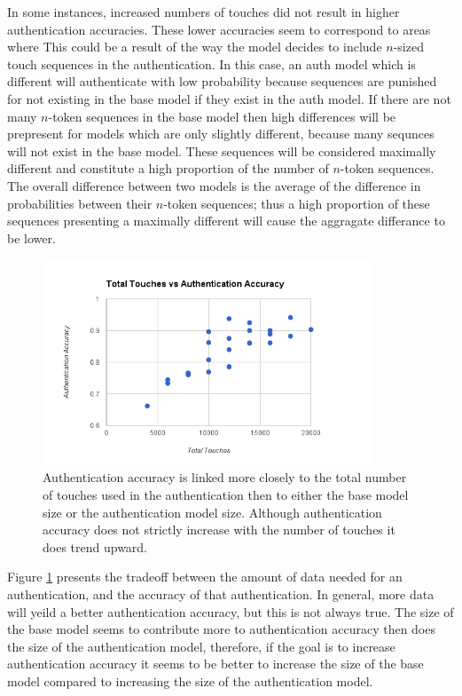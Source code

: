 \documentclass{acm_proc_article-sp}
\begin{document}
In some instances, increased numbers of touches did not result in higher authentication accuracies. 
These lower accuracies seem to correspond to areas where %
 This could be a result of the way the model decides to include $n$-sized touch sequences in the authentication. 
In this case, an auth model which is  different will authenticate with low probability because sequences are punished for not existing in the base model if they exist in the auth model.
If there are not many $n$-token sequences in the base model then high differences will be prepresent for models which are only slightly different, because many sequnces will not exist in the base model.
These sequences will be considered maximally different and constitute a high proportion of the number of $n$-token sequences.
The overall difference between two models is the average of the difference in probabilities between their $n$-token sequences; thus a high proportion of these sequences presenting a maximally different will cause the aggragate differance to be lower.

\begin{figure}
\centering
\includegraphics[width=3.9in]{total_touches_vs_authentication_accuracy.png}
\caption{Authentication accuracy is linked more closely to the total number of touches used in the authentication then to either the base model size or the authentication model size. Although authentication accuracy does not strictly increase with the number of touches it does trend upward.}
\label{fig:total_touches_vs_authentication_accuracy}
\end{figure}

%
Figure \ref{fig:total_touches_vs_authentication_accuracy} presents the tradeoff between the amount of data needed for an authentication, and the accuracy of that authentication.
In general, more data will yeild a better authentication accuracy, but this is not always true.
The size of the base model seems to contribute more to authentication accuracy then does the size of the authentication model, therefore, if the goal is to increase authentication accuracy it seems to be better to increase the size of the base model compared to increasing the size of the authentication model.
\end{document}
